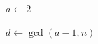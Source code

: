 \vspace{1em}
\begin{algorithm}[H]
    \SetAlgoVlined
    \SetAlgoLined
    
    \caption{Pollard $p-1$($n,B$)}
    \label{alg:Pollard_p-1}
  
    $a \gets 2$\;
    

    $d \gets \gcd(a-1, n)$\;

\end{algorithm}
\vspace{2em}
